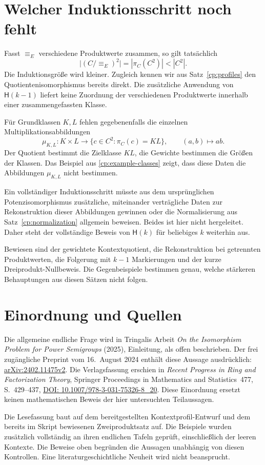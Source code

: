 \documentclass[a4paper,11pt]{article}
\begin{document}
\section{Welcher Induktionsschritt noch fehlt}

Fasst \(\equiv_E\) verschiedene Produktwerte zusammen, so gilt
tatsächlich
\[
 \bigl|(C/{\equiv_E})^2\bigr|
 =|\pi_C(C^2)|<|C^2|.
\]
Die Induktionsgröße wird kleiner. Zugleich kennen wir aus
Satz~\ref{cp:profiles} den Quotientenisomorphismus bereits direkt.
Die zusätzliche Anwendung von \(\mathsf H(k-1)\) liefert keine
Zuordnung der verschiedenen Produktwerte innerhalb einer
zusammengefassten Klasse.

Für Grundklassen \(K,L\) fehlen gegebenenfalls die einzelnen
Multiplikationsabbildungen
\[
 \mu_{K,L}:K\times L\longrightarrow
 \{c\in C^2:\pi_C(c)=KL\},\qquad (a,b)\longmapsto ab.
\]
Der Quotient bestimmt die Zielklasse \(KL\), die Gewichte
bestimmen die Größen der Klassen. Das Beispiel aus
\eqref{cp:example-classes} zeigt, dass diese Daten die
Abbildungen \(\mu_{K,L}\) nicht bestimmen.

Ein vollständiger Induktionsschritt müsste aus dem ursprünglichen
Potenzisomorphismus zusätzliche, miteinander verträgliche Daten
zur Rekonstruktion dieser Abbildungen gewinnen oder die
Normalisierung aus Satz~\ref{cp:normalization} allgemein beweisen.
Beides ist hier nicht hergeleitet. Daher steht der vollständige
Beweis von \(\mathsf H(k)\) für beliebiges \(k\) weiterhin aus.

Bewiesen sind der gewichtete Kontextquotient, die Rekonstruktion
bei getrennten Produktwerten, die Folgerung mit \(k-1\) Markierungen
und der kurze Dreiprodukt-Nullbeweis. Die Gegenbeispiele bestimmen
genau, welche stärkeren Behauptungen aus diesen Sätzen nicht
folgen.

\section*{Einordnung und Quellen}

Die allgemeine endliche Frage wird in Tringalis Arbeit
\emph{On the Isomorphism Problem for Power Semigroups}
(2025), Einleitung, als offen beschrieben. Der frei zugängliche
Preprint vom 16.~August 2024 enthält diese Aussage ausdrücklich:
\href{https://arxiv.org/html/2402.11475v2}{arXiv:2402.11475v2}.
Die Verlagsfassung erschien in \emph{Recent Progress in Ring and
Factorization Theory}, Springer Proceedings in Mathematics and
Statistics~477, S.~429--437,
\href{https://doi.org/10.1007/978-3-031-75326-8_20}{DOI: 10.1007/978-3-031-75326-8\_20}.
Diese Einordnung ersetzt keinen mathematischen Beweis der hier
untersuchten Teilaussagen.

Die Lesefassung baut auf dem bereitgestellten Kontextprofil-Entwurf
und dem bereits im Skript bewiesenen Zweiproduktsatz auf.
Die Beispiele wurden zusätzlich vollständig an ihren endlichen
Tafeln geprüft, einschließlich der leeren Kontexte. Die Beweise
oben begründen die Aussagen unabhängig von diesen Kontrollen.
Eine literaturgeschichtliche Neuheit wird nicht beansprucht.
\end{document}
